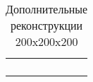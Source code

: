 		\begin{table}[h!]
			\begin{center}
				\begin{tabular}{p{5cm} p{5cm} p{5cm}}
					\toprule
					&
					&
					\\
					&
					&
					\\
					&
					&
					\\
					&
					&
					\\
					\bottomrule
				\end{tabular}
				\caption{Дополнительные реконструкции 200x200x200}
				\label{8-gen-200}
			\end{center}
		\end{table} 
	
